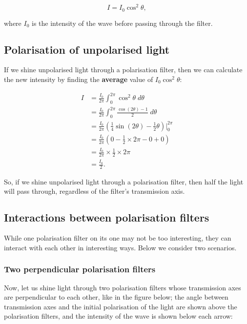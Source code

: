 \documentclass{paper}
\begin{document}
\begin{equation*}
    I = I_0\cos^2\theta,
\end{equation*}

where $I_0$ is the intensity of the wave before passing through the filter.

\subsection{Polarisation of unpolarised light}

If we shine unpolarised light through a polarisation filter, then we can calculate the new intensity by finding the \textbf{average} value of $I_0\cos^2\theta$:

\begin{align*}
    I &= \frac{I_0}{2\pi}\int_0^{2\pi} \cos^2\theta \; d\theta \\
    &= \frac{I_0}{2\pi}\int_0^{2\pi}\frac{\cos(2\theta) - 1}{2} \; d\theta \\
    &= \frac{I_0}{2\pi}\left(\frac{1}{4}\sin(2\theta) - \frac{1}{2}\theta\right)\Bigg\lvert_0^{2\pi} \\
    &= \frac{I_0}{2\pi}\left(0 - \frac{1}{2} \times 2\pi - 0 + 0\right) \\
    &= \frac{I_0}{2\pi} \times \frac{1}{2} \times 2\pi \\
    &= \frac{I_0}{2}.
\end{align*}

So, if we shine unpolarised light through a polarisation filter, then half the light will pass through, regardless of the filter's transmission axis.

\subsection{Interactions between polarisation filters}
While one polarisation filter on its one may not be too interesting, they can interact with each other in interesting ways. Below we consider two scenarios.

\subsubsection{Two perpendicular polarisation filters}
Now, let us shine light through two polarisation filters whose transmission axes are perpendicular to each other, like in the figure below; the angle between transmission axes and the initial polarisation of the light are shown above the polarisation filters, and the intensity of the wave is shown below each arrow:
\end{document}
